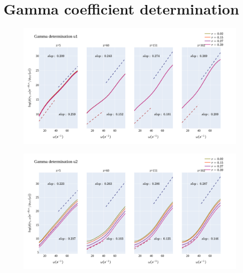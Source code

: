 \documentclass[]{article}
\theoremstyle{plain}
\theoremstyle{remark}
\begin{document}
\section{Gamma coefficient determination}

\begin{figure}[h!]
	\begin{center}
		\includegraphics[width=\textwidth]{../output/split_time/gamma/gamma_u1.png}
	\end{center}
\end{figure}

\begin{figure}[h!]
	\begin{center}
		\includegraphics[width=\textwidth]{../output/split_time/gamma/gamma_u2.png}
	\end{center}
\end{figure}
\end{document}
